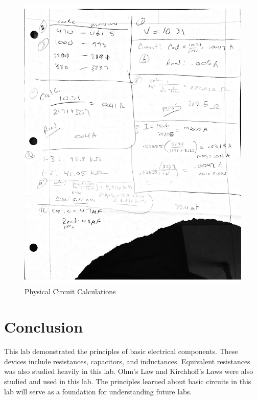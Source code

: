 \documentclass[12pt]{article}
\begin{document}
\begin{figure}[h!] %
   \centering
   \includegraphics[width=6in]{calculations_real.pdf} 
   \caption{Physical Circuit Calculations}
   \label{fig:example}
\end{figure}

\newpage

\section*{\fontsize{12}{12}\selectfont \large Conclusion}
This lab demonstrated the principles of basic electrical components. These devices include resistances, capacitors, and inductances. Equivalent resistances was also studied heavily in this lab. Ohm's Law and Kirchhoff's Laws were also studied and used in this lab. The principles learned about basic circuits in this lab will serve as a foundation for understanding future labs.
\end{document}
